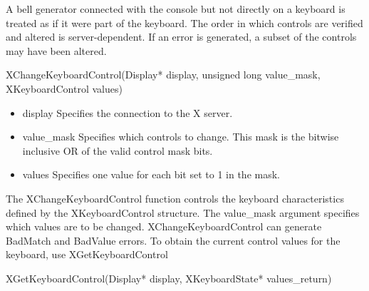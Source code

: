 \documentclass{report}
\begin{document}
\begin{itemize}
            \bigbreak \noindent 
            A bell generator connected with the console but not directly on a keyboard is treated as if it were part of the keyboard. The order in which controls are verified and altered is server-dependent. If an error is generated, a subset of the controls may have been altered.
            \bigbreak \noindent 
            \begin{cppcode}
            XChangeKeyboardControl(Display* display, unsigned long value_mask, XKeyboardControl values)
            \end{cppcode}
            \begin{itemize}
                \item display Specifies the connection to the X server.
                \item value\_mask Specifies which controls to change. This mask is the bitwise inclusive OR of the valid control mask bits.
                \item values Specifies one value for each bit set to 1 in the mask.
            \end{itemize}
            The XChangeKeyboardControl function controls the keyboard characteristics defined by the XKeyboardControl structure. The value\_mask argument specifies which values are to be changed.
            \bigbreak \noindent 
            XChangeKeyboardControl can generate BadMatch and BadValue errors.
            \bigbreak \noindent 
            To obtain the current control values for the keyboard, use XGetKeyboardControl
            \bigbreak \noindent 
            \begin{cppcode}
            XGetKeyboardControl(Display* display, XKeyboardState* values_return)
            \end{cppcode}
\end{itemize}
\end{document}
